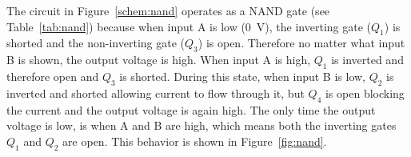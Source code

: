 The circuit in Figure~\ref{schem:nand} operates as a NAND gate (see Table~\ref{tab:nand}) because when input A is low (\SI{0}{V}), the inverting gate ($Q_1$) is shorted and the non-inverting gate ($Q_3$) is open.  Therefore no matter what input B is shown, the output voltage is high.  When input A is high, $Q_1$ is inverted and therefore open and $Q_3$ is shorted. During this state, when input B is low, $Q_2$ is inverted and shorted allowing current to flow through it, but $Q_4$ is open blocking the current and the output voltage is again high.  The only time the output voltage is low, is when A and B are high, which means both the inverting gates $Q_1$ and $Q_2$ are open.  This behavior is shown in Figure~\ref{fig:nand}.





